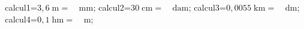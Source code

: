 \documentclass[exercice]{thedocument}%
\begin{document}
%
    \>calcul1=$3,6\;\text{m}=\quad\text{mm}$;%
    \>calcul2=$30\;\text{cm}=\quad\text{dam}$;%
    \>calcul3=$0,0055\;\text{km}=\quad\text{dm}$;%
    \>calcul4=$0,1\;\text{hm}=\quad\text{m}$;%
\end{document}
